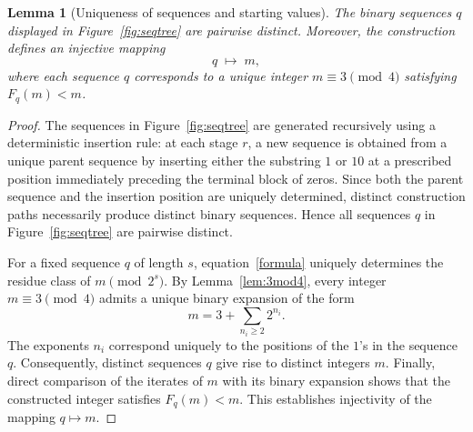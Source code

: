 \documentclass{amsart}
\newtheorem{lemma}[theorem]{Lemma}
\theoremstyle{definition}
\theoremstyle{remark}
\numberwithin{equation}{section}
\begin{document}
\begin{lemma}[Uniqueness of sequences and starting values]\label{lem:seqtree}
	The binary sequences $q$ displayed in Figure~\ref{fig:seqtree} are pairwise distinct. 
	Moreover, the construction defines an injective mapping
	\[
	q \;\longmapsto\; m,
	\]
	where each sequence $q$ corresponds to a unique integer $m \equiv 3 \pmod{4}$
	satisfying $F_q(m) < m$.
\end{lemma}

\begin{proof}
	The sequences in Figure~\ref{fig:seqtree} are generated recursively using a
	deterministic insertion rule: at each stage $r$, a new sequence is obtained from a
	unique parent sequence by inserting either the substring $1$ or $10$ at a prescribed
	position immediately preceding the terminal block of zeros. Since both the parent
	sequence and the insertion position are uniquely determined, distinct construction
	paths necessarily produce distinct binary sequences. Hence all sequences $q$ in
	Figure~\ref{fig:seqtree} are pairwise distinct.
	
	For a fixed sequence $q$ of length $s$, equation~\eqref{formula} uniquely determines
	the residue class of $m \pmod{2^s}$. By Lemma~\ref{lem:3mod4}, every integer
	$m \equiv 3 \pmod{4}$ admits a unique binary expansion of the form
	\[
	m = 3 + \sum_{n_i \ge 2} 2^{n_i}.
	\]
	The exponents $n_i$ correspond uniquely to the positions of the $1$'s in the
	sequence $q$. Consequently, distinct sequences $q$ give rise to distinct integers
	$m$. Finally, direct comparison of the iterates of $m$ with its binary expansion shows
	that the constructed integer satisfies $F_q(m) < m$. This establishes injectivity
	of the mapping $q \mapsto m$.
\end{proof}
\end{document}
